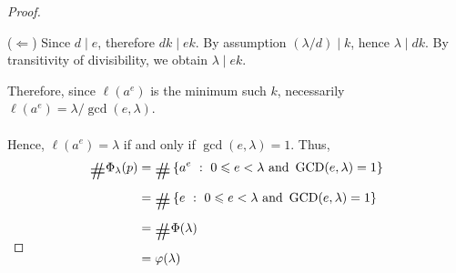 \begin{proof}
\begin{subproof}
($\Leftarrow$) Since $d\mid e$, therefore $dk \mid ek$. By assumption $(\lambda/d) \mid k$, hence $\lambda \mid dk$. By transitivity of divisibility, we obtain $\lambda \mid ek$.
\end{subproof}
\vspace*{1em}
Therefore, since $\ell(a^e)$ is the minimum such $k$, necessarily $\ell(a^e) = \lambda/\gcd(e,\lambda)$.\\
\\
Hence, $\ell(a^e) = \lambda$ if and only if $\gcd(e,\lambda) = 1$. Thus,
\begin{align*}
\card\Phi_\lambda(p) &= \card\setp{a^e}{0 \leq e < \lambda\text{ and }\gcd(e,\lambda) = 1}\\[0.5em]
&= \card\setp{e}{0 \leq e < \lambda\text{ and }\gcd(e,\lambda) = 1}\\[0.5em]
&= \card\Phi(\lambda)\\[0.5em]
&= \varphi(\lambda)\\[-3em]
\end{align*}
\end{proof}


